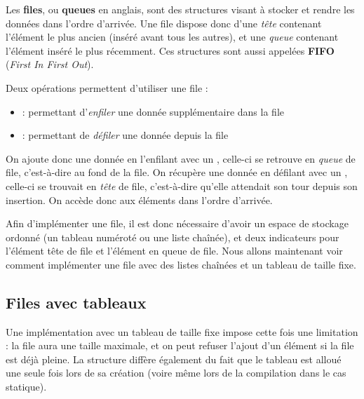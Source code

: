 \documentclass[11pt,a4paper]{article}
\begin{document}
\bigskip

Les \textbf{files}, ou \textbf{queues} en anglais, sont des structures visant à stocker et rendre les données dans l'ordre d'arrivée.
Une file dispose donc d'une \textit{tête} contenant l'élément le plus ancien (inséré avant tous les autres), et une \textit{queue} contenant l'élément inséré le plus récemment.
Ces structures sont aussi appelées \textbf{FIFO} (\textit{First In First Out}).\\

\medskip

Deux opérations permettent d'utiliser une file :
\begin{itemize}
\item {} : permettant d'\textit{enfiler} une donnée supplémentaire dans la file
\item {} : permettant de \textit{défiler} une donnée depuis la file
\end{itemize}
On ajoute donc une donnée en l'enfilant avec un , celle-ci se retrouve en \textit{queue} de file, c'est-à-dire au fond de la file.
On récupère une donnée en défilant avec un , celle-ci se trouvait en \textit{tête} de file, c'est-à-dire qu'elle attendait son tour depuis son insertion.
On accède donc aux éléments dans l'ordre d'arrivée.\\

\medskip

Afin d'implémenter une file, il est donc nécessaire d'avoir un espace de stockage ordonné (un tableau numéroté ou une liste chaînée), et deux indicateurs pour l'élément tête de file et l'élément en queue de file.
Nous allons maintenant voir comment implémenter une file avec des listes chaînées et un tableau de taille fixe.


\bigskip


\subsection{Files avec tableaux}

\bigskip

Une implémentation avec un tableau de taille fixe impose cette fois une limitation : la file aura une taille maximale, et on peut refuser l'ajout d'un élément si la file est déjà pleine.
La structure diffère également du fait que le tableau est alloué une seule fois lors de sa création (voire même lors de la compilation dans le cas statique).
\end{document}
